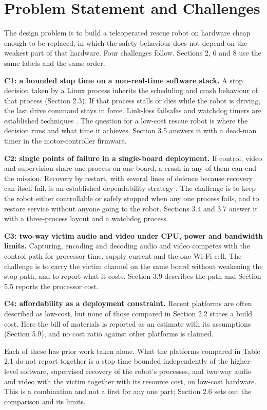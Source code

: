 \section{Problem Statement and Challenges}

The design problem is to build a teleoperated rescue robot on hardware cheap enough to be replaced, in which the safety behaviour does not depend on the weakest part of that hardware. Four challenges follow. Sections 2, 6 and 8 use the same labels and the same order.

\textbf{C1: a bounded stop time on a non-real-time software stack.} A stop decision taken by a Linux process inherits the scheduling and crash behaviour of that process (Section 2.3). If that process stalls or dies while the robot is driving, the last drive command stays in force. Link-loss failsafes and watchdog timers are established techniques \cite{ardupilot_rover_failsafe,madhushankara2024}. The question for a low-cost rescue robot is where the decision runs and what time it achieves. Section 3.5 answers it with a dead-man timer in the motor-controller firmware.

\textbf{C2: single points of failure in a single-board deployment.} If control, video and supervision share one process on one board, a crash in any of them can end the mission. Recovery by restart, with several lines of defence because recovery can itself fail, is an established dependability strategy \cite{candea2004}. The challenge is to keep the robot either controllable or safely stopped when any one process fails, and to restore service without anyone going to the robot. Sections 3.4 and 3.7 answer it with a three-process layout and a watchdog process.

\textbf{C3: two-way victim audio and video under CPU, power and bandwidth limits.} Capturing, encoding and decoding audio and video competes with the control path for processor time, supply current and the one Wi-Fi cell. The challenge is to carry the victim channel on the same board without weakening the stop path, and to report what it costs. Section 3.9 describes the path and Section 5.5 reports the processor cost.

\textbf{C4: affordability as a deployment constraint.} Recent platforms are often described as low-cost, but none of those compared in Section 2.2 states a build cost. Here the bill of materials is reported as an estimate with its assumptions (Section 5.9), and no cost ratio against other platforms is claimed.

Each of these has prior work taken alone. What the platforms compared in Table 2.1 do not report together is a stop time bounded independently of the higher-level software, supervised recovery of the robot's processes, and two-way audio and video with the victim together with its resource cost, on low-cost hardware. This is a combination and not a first for any one part; Section 2.6 sets out the comparison and its limits.

